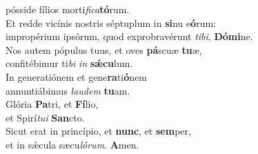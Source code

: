 \evenverse pósside fílios morti\textit{fi}\textit{ca}\textbf{tó}rum.\\
\oddverse Et redde vicínis nostris séptuplum in \textbf{si}nu e\textbf{ó}rum:~\*\\
\oddverse impropérium ipsórum, quod exprobravérunt \textit{ti}\textit{bi}, \textbf{Dó}\textbf{mi}ne.\\
\evenverse Nos autem pópulus tuus, et oves \textbf{pá}scuæ \textbf{tu}æ,~\*\\
\evenverse confitébimur ti\textit{bi} \textit{in} \textbf{sǽ}\textbf{cu}lum.\\
\oddverse In generatiónem et gene\textbf{ra}ti\textbf{ó}nem~\*\\
\oddverse annuntiábimus \textit{lau}\textit{dem} \textbf{tu}am.\\
\evenverse Glória \textbf{Pa}tri, et \textbf{Fí}lio,~\*\\
\evenverse et Spirí\textit{tu}\textit{i} \textbf{San}cto.\\
\oddverse Sicut erat in princípio, et \textbf{nunc}, et \textbf{sem}per,~\*\\
\oddverse et in sǽcula sæcu\textit{ló}\textit{rum}. \textbf{A}men.\\
